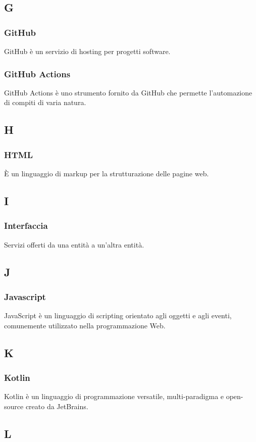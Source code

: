 \subsection*{G}
\subsubsection*{GitHub} GitHub è un servizio di hosting per progetti software.
\subsubsection*{GitHub Actions} GitHub Actions è uno strumento fornito da GitHub che permette l’automazione di compiti di varia natura.
\subsection*{H}
\subsubsection*{HTML} È un linguaggio di markup per la strutturazione delle pagine web.
\subsection*{I}
\subsubsection*{Interfaccia} Servizi offerti da una entità a un'altra entità.
\subsection*{J}
\subsubsection*{Javascript} JavaScript è un linguaggio di scripting orientato agli oggetti e agli eventi, comunemente utilizzato nella programmazione Web.
\subsection*{K}
\subsubsection*{Kotlin} Kotlin è un linguaggio di programmazione versatile, multi-paradigma e open-source creato da JetBrains.
\subsection*{L}

